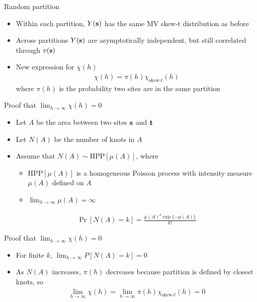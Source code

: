 \documentclass{beamer}
\begin{document}
\begin{frame}{Random partition}
  \begin{itemize} \setlength{\itemsep}{1em}
    \item Within each partition, $Y(\mbox{\bf s})$ has the same MV skew-t distribution as before
    \item Across partitions $Y(\mbox{\bf s})$ are asymptotically independent, but still correlated through $v(\mbox{\bf s})$
    \item New expression for $\chi(h)$
    \begin{align*}
      \chi(h) = \pi(h) \chi_{\text{skew-}t}(h)
    \end{align*}
    where $\pi(h)$ is the probability two sites are in the same partition
  \end{itemize}
\end{frame}

\begin{frame}{Proof that $\lim_{h \rightarrow \infty} \chi(h) = 0$}
  \begin{itemize} \setlength{\itemsep}{1em}
    \item Let $A$ be the area between two sites $\mbox{\bf s}$ and $\mbox{\bf t}$
    \item Let $N(A)$ be the number of knots in $A$
    \item Assume that $N(A) \sim \text{HPP}[\mu(A)]$, where \vspace{0.25em}
    \begin{itemize} \setlength{\itemsep}{0.25em}
      \item HPP$[\mu(A)]$ is a homogeneous Poisson process with intensity measure $\mu(A)$ defined on $A$
      \item $\lim_{h \rightarrow \infty} \mu(A) = \infty$
    \end{itemize}
    \begin{align*}
      \Pr[N(A) = k] = \frac{ \mu(A)^k \exp\{-\mu(A)\}}{k!}
    \end{align*}
  \end{itemize}
\end{frame}

\begin{frame}{Proof that $\lim_{h \rightarrow \infty} \chi(h) = 0$}
  \begin{itemize} \setlength{\itemsep}{1em}
    \item For finite $k$, $\lim_{h \rightarrow \infty} P[N(A) = k] = 0$
    \item As $N(A)$ increases, $\pi(h)$ decreases because partition is defined by closest knots, so
    \begin{align*}
      \lim_{h \rightarrow \infty} \chi(h) = \lim_{h \rightarrow \infty} \pi(h) \chi_{\text{skew-}t} (h) = 0
    \end{align*}
  \end{itemize}
\end{frame}
\end{document}
